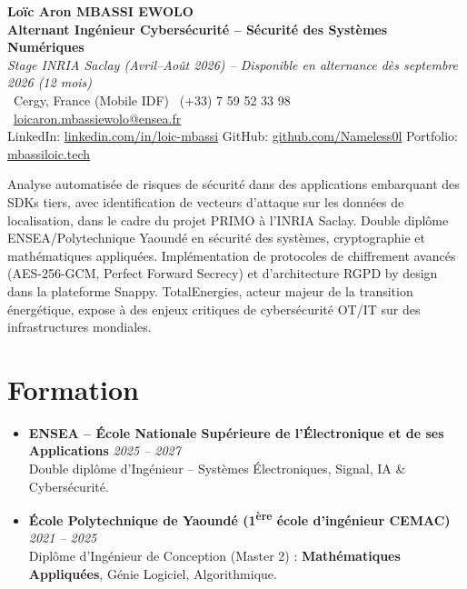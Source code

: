 \documentclass[a4paper,11pt]{article}
\begin{document}
\begin{center}
    {\Large \textbf{Lo\"ic Aron MBASSI EWOLO}} \\ \vspace{4pt}
    \textbf{\large Alternant Ing\'enieur Cybersécurité -- Sécurité des Syst\`emes Num\'eriques} \\
    \textit{\small Stage INRIA Saclay (Avril--Ao\^ut 2026) -- Disponible en alternance d\`es septembre 2026 (12 mois)} \\ \vspace{4pt}
    \small
    \Pointinghand\ Cergy, France (Mobile IDF) \quad \Mobilefone\ (+33) 7 59 52 33 98 \quad
    {\color{primary}\Letter\ \href{mailto:loicaron.mbassiewolo@ensea.fr}{loicaron.mbassiewolo@ensea.fr}} \\ \vspace{2pt}
    {\color{primary}LinkedIn: \href{https://www.linkedin.com/in/loic-mbassi/}{linkedin.com/in/loic-mbassi}} \quad
    {\color{primary}GitHub: \href{https://github.com/Nameless0l}{github.com/Nameless0l}} \quad
    {\color{primary}Portfolio: \href{https://mbassiloic.tech}{mbassiloic.tech}}
\end{center}
\vspace{-6pt}
\noindent\small{Analyse automatisée de risques de sécurité dans des applications embarquant des SDKs tiers, avec identification de vecteurs d'attaque sur les données de localisation, dans le cadre du projet PRIMO à l'INRIA Saclay. Double diplôme ENSEA/Polytechnique Yaoundé en sécurité des systèmes, cryptographie et mathématiques appliquées. Implémentation de protocoles de chiffrement avancés (AES-256-GCM, Perfect Forward Secrecy) et d'architecture RGPD by design dans la plateforme Snappy. TotalEnergies, acteur majeur de la transition énergétique, expose à des enjeux critiques de cybersécurité OT/IT sur des infrastructures mondiales.}

\section{Formation}
\begin{itemize}[leftmargin=*, label=\tiny$\bullet$, nosep]
    \item \textbf{ENSEA -- \'Ecole Nationale Sup\'erieure de l'\'Electronique et de ses Applications} \hfill \textit{2025 -- 2027} \\
    \small{Double dipl\^ome d'Ing\'enieur -- Syst\`emes \'Electroniques, Signal, IA \& Cybersécurité.}
    \item \textbf{\'Ecole Polytechnique de Yaound\'e (1\textsuperscript{\`ere} \'ecole d'ing\'enieur CEMAC)} \hfill \textit{2021 -- 2025} \\
    \small{Dipl\^ome d'Ing\'enieur de Conception (Master 2) : \textbf{Math\'ematiques Appliqu\'ees}, G\'enie Logiciel, Algorithmique.}
\end{itemize}
\end{document}

